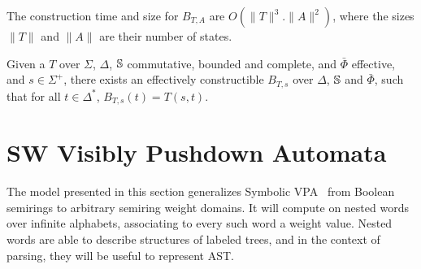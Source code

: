 \noindent
The construction time and size for $B_{T, A}$ are $O(\| T \|^3 . \| A \|^2)$,
where the sizes $\| T \|$ and $\| A \|$ are their number of states.


\begin{corollary} \label{cor:epsilon}
Given a \SWT $T$ over $\Sigma$, $\Delta$, 
$\mathbb{S}$ commutative, bounded and complete,
and $\bar\Phi$ effective,
and $s \in \Sigma^+$, 
there exists an effectively constructible \SWA 
$B_{T, s}$ over $\Delta$, $\mathbb{S}$ and $\bar\Phi$,
such that for all $t \in \Delta^*$, $B_{T, s}(t) = T(s, t)$.
\end{corollary}



 







\section{SW Visibly Pushdown Automata}
\label{section:SWVPA}\label{sec:SWVPA}
The model presented in this section generalizes Symbolic VPA~\cite{dAntonyAlur14SVPDA}
from Boolean semirings to arbitrary semiring weight domains.
It will compute on nested words over infinite alphabets, 
associating to every such word a weight value. 
Nested words are able to describe structures of labeled trees, 
and in the context of parsing, they will be useful to 
represent AST. %

